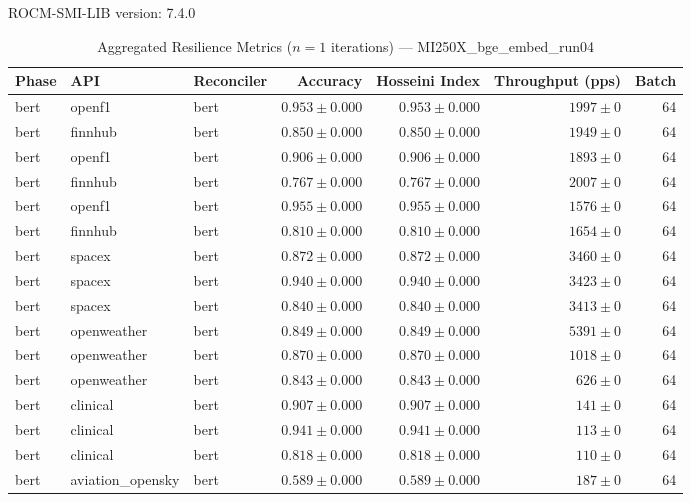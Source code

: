 ROCM-SMI-LIB version: 7.4.0

\begin{table}[htbp]
\caption{Aggregated Resilience Metrics ($n=1$ iterations) --- MI250X_bge_embed_run04}
\begin{tabular}{l l l r r r r}
\hline
Phase & API & Reconciler & Accuracy & Hosseini Index & Throughput (pps) & Batch \\
\hline
bert & openf1 & bert & $0.953\pm0.000$ & $0.953\pm0.000$ & $1997\pm0$ & 64 \\
bert & finnhub & bert & $0.850\pm0.000$ & $0.850\pm0.000$ & $1949\pm0$ & 64 \\
bert & openf1 & bert & $0.906\pm0.000$ & $0.906\pm0.000$ & $1893\pm0$ & 64 \\
bert & finnhub & bert & $0.767\pm0.000$ & $0.767\pm0.000$ & $2007\pm0$ & 64 \\
bert & openf1 & bert & $0.955\pm0.000$ & $0.955\pm0.000$ & $1576\pm0$ & 64 \\
bert & finnhub & bert & $0.810\pm0.000$ & $0.810\pm0.000$ & $1654\pm0$ & 64 \\
bert & spacex & bert & $0.872\pm0.000$ & $0.872\pm0.000$ & $3460\pm0$ & 64 \\
bert & spacex & bert & $0.940\pm0.000$ & $0.940\pm0.000$ & $3423\pm0$ & 64 \\
bert & spacex & bert & $0.840\pm0.000$ & $0.840\pm0.000$ & $3413\pm0$ & 64 \\
bert & openweather & bert & $0.849\pm0.000$ & $0.849\pm0.000$ & $5391\pm0$ & 64 \\
bert & openweather & bert & $0.870\pm0.000$ & $0.870\pm0.000$ & $1018\pm0$ & 64 \\
bert & openweather & bert & $0.843\pm0.000$ & $0.843\pm0.000$ & $626\pm0$ & 64 \\
bert & clinical & bert & $0.907\pm0.000$ & $0.907\pm0.000$ & $141\pm0$ & 64 \\
bert & clinical & bert & $0.941\pm0.000$ & $0.941\pm0.000$ & $113\pm0$ & 64 \\
bert & clinical & bert & $0.818\pm0.000$ & $0.818\pm0.000$ & $110\pm0$ & 64 \\
bert & aviation\_opensky & bert & $0.589\pm0.000$ & $0.589\pm0.000$ & $187\pm0$ & 64 \\

\end{tabular}
\end{table}
